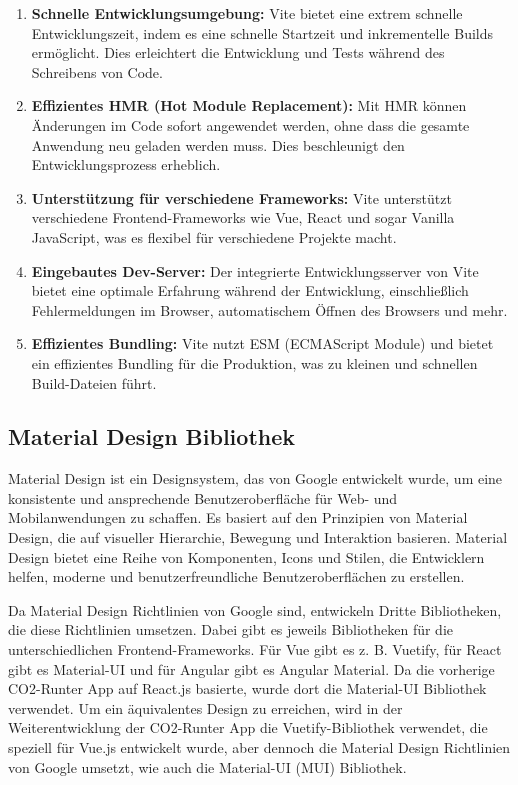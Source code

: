 \begin{enumerate}
    \item \textbf{Schnelle Entwicklungsumgebung:} Vite bietet eine extrem schnelle Entwicklungszeit, indem es eine schnelle Startzeit und inkrementelle Builds ermöglicht. Dies erleichtert die Entwicklung und Tests während des Schreibens von Code.

    \item \textbf{Effizientes HMR (Hot Module Replacement):} Mit HMR können Änderungen im Code sofort angewendet werden, ohne dass die gesamte Anwendung neu geladen werden muss. Dies beschleunigt den Entwicklungsprozess erheblich.

    \item \textbf{Unterstützung für verschiedene Frameworks:} Vite unterstützt verschiedene Frontend-Frameworks wie Vue, React und sogar Vanilla JavaScript, was es flexibel für verschiedene Projekte macht.

    \item \textbf{Eingebautes Dev-Server:} Der integrierte Entwicklungsserver von Vite bietet eine optimale Erfahrung während der Entwicklung, einschließlich Fehlermeldungen im Browser, automatischem Öffnen des Browsers und mehr.

    \item \textbf{Effizientes Bundling:} Vite nutzt ESM (ECMAScript Module) und bietet ein effizientes Bundling für die Produktion, was zu kleinen und schnellen Build-Dateien führt.
\end{enumerate}

\subsection{Material Design Bibliothek}

Material Design ist ein Designsystem, das von Google entwickelt wurde, um eine konsistente und ansprechende Benutzeroberfläche für Web- und Mobilanwendungen zu schaffen. Es basiert auf den Prinzipien von Material Design, die auf visueller Hierarchie, Bewegung und Interaktion basieren. Material Design bietet eine Reihe von Komponenten, Icons und Stilen, die Entwicklern helfen, moderne und benutzerfreundliche Benutzeroberflächen zu erstellen. \cite{materialdesign}

Da Material Design Richtlinien von Google sind, entwickeln Dritte Bibliotheken, die diese Richtlinien umsetzen. Dabei gibt es jeweils Bibliotheken für die unterschiedlichen Frontend-Frameworks. Für Vue gibt es z. B. Vuetify, für React gibt es Material-UI und für Angular gibt es Angular Material. Da die vorherige CO2-Runter App auf React.js basierte, wurde dort die Material-UI Bibliothek verwendet. Um ein äquivalentes Design zu erreichen, wird in der Weiterentwicklung der CO2-Runter App die Vuetify-Bibliothek verwendet, die speziell für Vue.js entwickelt wurde, aber dennoch die Material Design Richtlinien von Google umsetzt, wie auch die Material-UI (MUI) Bibliothek.

